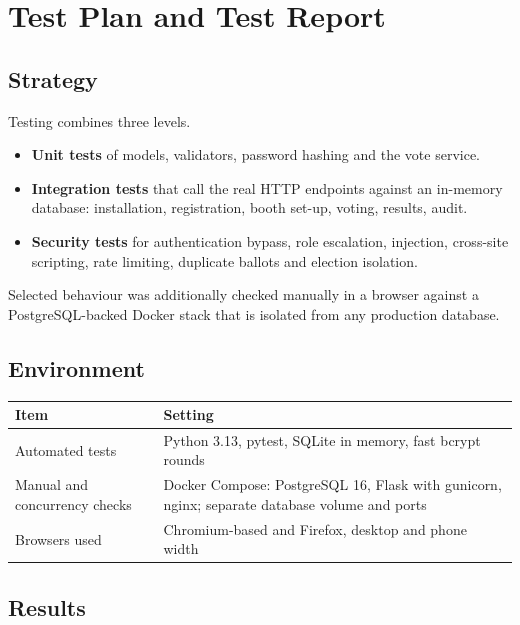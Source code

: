 \chapter{Test Plan and Test Report}
\label{chap:test}

\section{Strategy}

Testing combines three levels.

\begin{itemize}
  \item \textbf{Unit tests} of models, validators, password hashing and the vote service.
  \item \textbf{Integration tests} that call the real HTTP endpoints against an in-memory database: installation, registration, booth set-up, voting, results, audit.
  \item \textbf{Security tests} for authentication bypass, role escalation, injection, cross-site scripting, rate limiting, duplicate ballots and election isolation.
\end{itemize}

Selected behaviour was additionally checked manually in a browser against a PostgreSQL-backed Docker stack that is isolated from any production database.

\section{Environment}

\begin{center}
\begin{tabularx}{\linewidth}{@{}lX@{}}
\toprule
\textbf{Item} & \textbf{Setting} \\
\midrule
Automated tests & Python 3.13, pytest, SQLite in memory, fast bcrypt rounds \\
Manual and concurrency checks & Docker Compose: PostgreSQL 16, Flask with gunicorn, nginx; separate database volume and ports \\
Browsers used & Chromium-based and Firefox, desktop and phone width \\
\bottomrule
\end{tabularx}
\end{center}

\section{Results}

